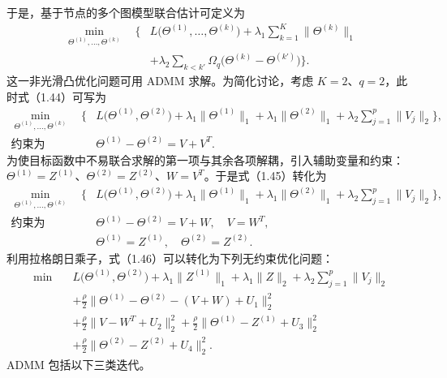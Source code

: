 于是，基于节点的多个图模型联合估计可定义为
\begin{equation}
\begin{aligned}
\min_{\Theta^{(1)},\ldots,\Theta^{(k)}}\quad\biggl\{&L\bigl(\Theta^{(1)},\ldots,\Theta^{(k)}\bigr)
+\lambda_1\sum_{k=1}^K\|\Theta^{(k)}\|_1\\
&+\lambda_2\sum_{k<k'}\Omega_q\bigl(\Theta^{(k)}-\Theta^{(k')}\bigr)\biggr\}.
\end{aligned}\tag{1.44}
\end{equation}
这一非光滑凸优化问题可用 ADMM 求解。为简化讨论，考虑 $K=2$、$q=2$，此时式（1.44）可写为
\begin{equation}
\begin{aligned}
\min_{\Theta^{(1)},\ldots,\Theta^{(k)}}\quad\biggl\{&L\bigl(\Theta^{(1)},\Theta^{(2)}\bigr)
+\lambda_1\|\Theta^{(1)}\|_1+\lambda_1\|\Theta^{(2)}\|_1
+\lambda_2\sum_{j=1}^p\|V_j\|_2\biggr\},\\
\text{约束为}\quad&\Theta^{(1)}-\Theta^{(2)}=V+V^T.
\end{aligned}\tag{1.45}
\end{equation}
为使目标函数中不易联合求解的第一项与其余各项解耦，引入辅助变量和约束：$\Theta^{(1)}=Z^{(1)}$、$\Theta^{(2)}=Z^{(2)}$、$W=V^T$。于是式（1.45）转化为
\begin{equation}
\begin{aligned}
\min_{\Theta^{(1)},\ldots,\Theta^{(k)}}\quad\biggl\{&L\bigl(\Theta^{(1)},\Theta^{(2)}\bigr)
+\lambda_1\|\Theta^{(1)}\|_1+\lambda_1\|\Theta^{(2)}\|_1
+\lambda_2\sum_{j=1}^p\|V_j\|_2\biggr\},\\
\text{约束为}\quad&\Theta^{(1)}-\Theta^{(2)}=V+W,\quad V=W^T,\\
&\Theta^{(1)}=Z^{(1)},\quad \Theta^{(2)}=Z^{(2)}.
\end{aligned}\tag{1.46}
\end{equation}
利用拉格朗日乘子，式（1.46）可以转化为下列无约束优化问题：
\begin{equation}
\begin{aligned}
\min\quad&L\bigl(\Theta^{(1)},\Theta^{(2)}\bigr)
+\lambda_1\|Z^{(1)}\|_1+\lambda_1\|Z\|_2+\lambda_2\sum_{j=1}^p\|V_j\|_2\\
&+\frac\rho2\|\Theta^{(1)}-\Theta^{(2)}-(V+W)+U_1\|_2^2\\
&+\frac\rho2\|V-W^T+U_2\|_2^2
+\frac\rho2\|\Theta^{(1)}-Z^{(1)}+U_3\|_2^2\\
&+\frac\rho2\|\Theta^{(2)}-Z^{(2)}+U_4\|_2^2.
\end{aligned}\tag{1.47}
\end{equation}
ADMM 包括以下三类迭代。

